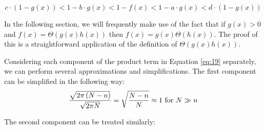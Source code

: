 \documentclass{article}
\theoremstyle{definition}
\begin{document}
$$c \cdot (1-g(x))<1-b\cdot g(x)< 1-f(x)<1-a\cdot g(x)<d \cdot (1-g(x))$$ 

\noindent In the following section, we will frequently make use of the fact that if $g(x)>0$ and $f(x)=\Theta{\left(g(x)h(x)\right)}$ then $f(x)=g(x)\Theta{\left(h(x)\right)}$. The proof of this is a straightforward application of the definition of $\Theta{\left(g(x)h(x)\right)}$.


 Considering each component of the product term in Equation \ref{eq:19} separately, we can perform several approximations and simplifications. The first component can be simplified in the following way:
\begin{equation}
    \frac{\sqrt{2\pi \left(N-n\right)}}{\sqrt{2\pi N}}=\sqrt{\frac{N-n}{N}}\approx 1 \text{ for } N \gg n \nonumber\\
    \end{equation}

\noindent The second component can be treated similarly:
\end{document}
